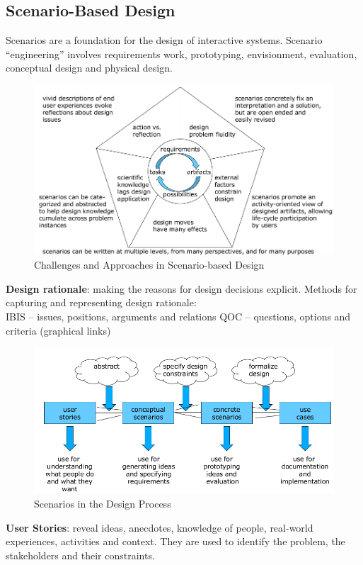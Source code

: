 \subsection{Scenario-Based Design}
Scenarios are a foundation for the design of interactive systems. Scenario ``engineering'' involves requirements work, prototyping, envisionment, evaluation, conceptual design and physical design.

\begin{figure}[h!]
	\centering
	\includegraphics[width=.8\textwidth]{img/ch06_scene.png}
	\caption{Challenges and Approaches in Scenario-based Design}
	\label{scen}
\end{figure}
\textbf{Design rationale}: making the reasons for design decisions explicit. Methods for capturing and representing design rationale:\\
IBIS – issues, positions, arguments and relations
QOC – questions, options and criteria (graphical links)\\

\begin{figure}[h!]
	\centering
	\includegraphics[width=.8\textwidth]{img/ch06_scene1.png}
	\caption{Scenarios in the Design Process}
	\label{scen1}
\end{figure}

\textbf{User Stories}: reveal ideas, anecdotes, knowledge of people, real-world experiences, activities and context. They are used to identify the problem, the stakeholders and their constraints.\\

